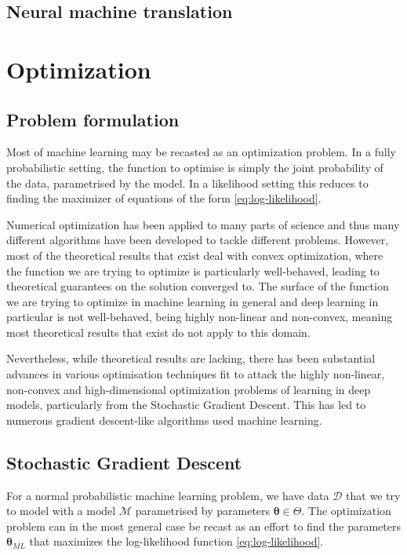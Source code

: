 \subsection{Neural machine translation}

\section{Optimization}

\subsection{Problem formulation}

Most of machine learning may be recasted as an optimization problem. In a fully
probabilistic setting, the function to optimise is simply the joint probability
of the data, parametrised by the model. In a likelihood setting this reduces to
finding the maximizer of equations of the form \ref{eq:log-likelihood}.

Numerical optimization has been applied to many parts of science and thus many
different algorithms have been developed to tackle different problems. However,
most of the theoretical results that exist deal with convex optimization, where
the function we are trying to optimize is particularly well-behaved, leading to
theoretical guarantees on the solution converged to. The surface of the function
we are trying to optimize in machine learning in general and deep learning in
particular is not well-behaved, being highly non-linear and non-convex, meaning
most theoretical results that exist do not apply to this domain\cite{choromanska_loss_2014}.

Nevertheless, while theoretical results are lacking, there has been substantial
advances in various optimisation techniques fit to attack the highly non-linear,
non-convex and high-dimensional optimization problems of learning in deep
models, particularly from the Stochastic Gradient Descent. This has led to
numerous gradient descent-like algorithms used machine learning\cite{Ruder17}.

\subsection{Stochastic Gradient Descent}

For a normal probabilistic machine learning problem, we have data $\mathcal{D}$
that we try to model with a model $\mathcal{M}$ parametrised by parameters
$\bm{\theta} \in \Theta$. The optimization problem can in the most general case be recast
as an effort to find the parameters $\bm{\theta}_{ML}$ that maximizes the
log-likelihood function \ref{eq:log-likelihood}.

